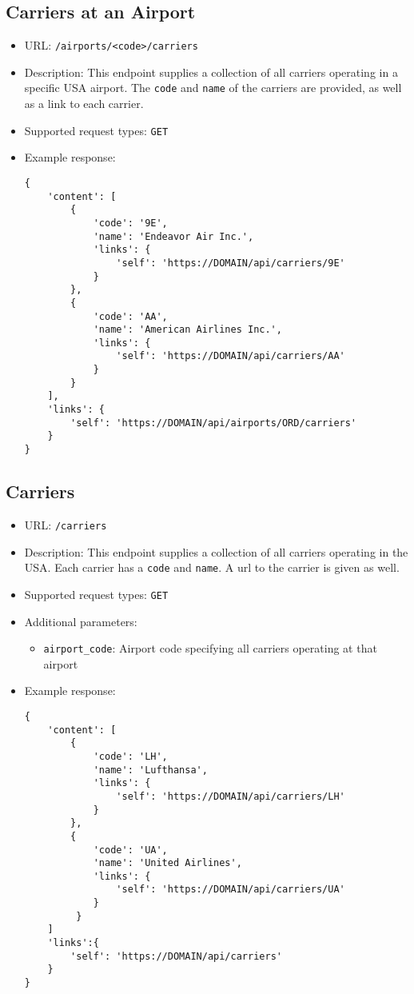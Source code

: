 \documentclass{article}
\begin{document}
	\subsection{Carriers at an Airport}
	    \begin{itemize}
			\item URL: \texttt{/airports/<code>/carriers}
			\item Description: This endpoint supplies a collection of all carriers operating in a specific USA airport. The \texttt{code} and \texttt{name} of the carriers are provided, as well as a link to each carrier.
			\item Supported request types: \texttt{GET}
			\item Example response:
			\begin{lstlisting}
{
    'content': [
        {
            'code': '9E',
            'name': 'Endeavor Air Inc.',
            'links': {
                'self': 'https://DOMAIN/api/carriers/9E'
            }
        },
        {
            'code': 'AA',
            'name': 'American Airlines Inc.',
            'links': {
                'self': 'https://DOMAIN/api/carriers/AA'
            }
        }
    ],
    'links': {
        'self': 'https://DOMAIN/api/airports/ORD/carriers'
    }
}

			\end{lstlisting}
		\end{itemize}
		
    \subsection{Carriers}
		\begin{itemize}
		\item URL: \texttt{/carriers}
		\item Description: This endpoint supplies a collection of all carriers operating in the USA. Each carrier has a \texttt{code} and \texttt{name}. A url to the carrier is given as well.
		\item Supported request types: \texttt{GET}
		\item Additional parameters:
			\begin{itemize}
				\item \texttt{airport\_code}: Airport code specifying all carriers operating at that airport
			\end{itemize}
		\item Example response:
		\begin{lstlisting}
{
    'content': [
        {
        	'code': 'LH',
        	'name': 'Lufthansa',
        	'links': {
        		'self': 'https://DOMAIN/api/carriers/LH'
        	}
        },
	    {
    		'code': 'UA',
    		'name': 'United Airlines',
    		'links': {
    			'self': 'https://DOMAIN/api/carriers/UA'
    		}
         }
    ]
    'links':{
        'self': 'https://DOMAIN/api/carriers'
    }
}
			\end{lstlisting}
		\end{itemize}
		
\end{document}

